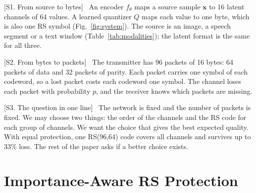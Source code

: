 \documentclass[journal]{IEEEtran}
\newcommand{\beat}[1]{\noindent\textcolor{blue!60!black}{\textsf{\footnotesize [#1]}}\ }
\begin{document}
\beat{S1. From source to bytes}
An encoder $f_\theta$ maps a source sample $\mathbf{x}$ to 16 latent channels of 64 values. A learned
quantizer $Q$ maps each value to one byte, which is also one RS symbol (Fig.~\ref{fig:system}). The
source is an image, a speech segment or a text window (Table~\ref{tab:modalities}); the latent format
is the same for all three.

\begin{table}[t]\centering\caption{Three sources, one latent format}\label{tab:modalities}
\end{table}

\beat{S2. From bytes to packets}
The transmitter has 96 packets of 16 bytes: 64 packets of data and 32 packets of parity. Each packet
carries one symbol of each codeword, so a lost packet costs each codeword one symbol. The channel loses
each packet with probability $p$, and the receiver knows which packets are missing.

\beat{S3. The question in one line}
The network is fixed and the number of packets is fixed. We may choose two things: the order of the
channels and the RS code for each group of channels. We want the choice that gives the best expected
quality. With equal protection, one RS(96,64) code covers all channels and survives up to 33\% loss.
The rest of the paper asks if a better choice exists.

\section{Importance-Aware RS Protection}\label{sec:method}
\end{document}

